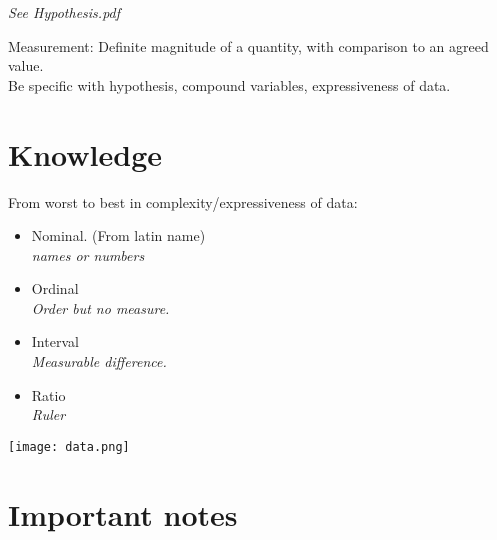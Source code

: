 \documentclass{article}
\begin{document}
\textit{See Hypothesis.pdf}\medskip

Measurement: Definite magnitude of a quantity, with comparison to an agreed value.\\

Be specific with hypothesis, compound variables, expressiveness of data.

\newpage
\section{Knowledge}
From worst to best in complexity/expressiveness of data:
\begin{itemize}
    \item Nominal. (From latin name)\\
        \textit{names or numbers}
  \item Ordinal\\
    \textit{Order but no measure.}
  \item Interval\\
    \textit{Measurable difference.}
  \item Ratio\\
    \textit{Ruler}
\end{itemize}
\texttt{[image: data.png]}

\section{Important notes}
\end{document}
